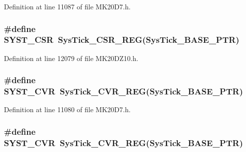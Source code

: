 Definition at line 11087 of file M\+K20\+D7.\+h.

\subsubsection[{\texorpdfstring{S\+Y\+S\+T\+\_\+\+C\+SR}{SYST_CSR}}]{\setlength{\rightskip}{0pt plus 5cm}\#define S\+Y\+S\+T\+\_\+\+C\+SR~{\bf Sys\+Tick\+\_\+\+C\+S\+R\+\_\+\+R\+EG}({\bf Sys\+Tick\+\_\+\+B\+A\+S\+E\+\_\+\+P\+TR})}\hypertarget{group___sys_tick___register___accessor___macros_gab26b3fc75982181f81b185b206e897f6}{}\label{group___sys_tick___register___accessor___macros_gab26b3fc75982181f81b185b206e897f6}


Definition at line 12079 of file M\+K20\+D\+Z10.\+h.

\subsubsection[{\texorpdfstring{S\+Y\+S\+T\+\_\+\+C\+VR}{SYST_CVR}}]{\setlength{\rightskip}{0pt plus 5cm}\#define S\+Y\+S\+T\+\_\+\+C\+VR~{\bf Sys\+Tick\+\_\+\+C\+V\+R\+\_\+\+R\+EG}({\bf Sys\+Tick\+\_\+\+B\+A\+S\+E\+\_\+\+P\+TR})}\hypertarget{group___sys_tick___register___accessor___macros_gae3dc4d2dbfdf38c593a5581415fecfed}{}\label{group___sys_tick___register___accessor___macros_gae3dc4d2dbfdf38c593a5581415fecfed}


Definition at line 11080 of file M\+K20\+D7.\+h.

\subsubsection[{\texorpdfstring{S\+Y\+S\+T\+\_\+\+C\+VR}{SYST_CVR}}]{\setlength{\rightskip}{0pt plus 5cm}\#define S\+Y\+S\+T\+\_\+\+C\+VR~{\bf Sys\+Tick\+\_\+\+C\+V\+R\+\_\+\+R\+EG}({\bf Sys\+Tick\+\_\+\+B\+A\+S\+E\+\_\+\+P\+TR})}\hypertarget{group___sys_tick___register___accessor___macros_gae3dc4d2dbfdf38c593a5581415fecfed}{}\label{group___sys_tick___register___accessor___macros_gae3dc4d2dbfdf38c593a5581415fecfed}


